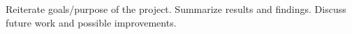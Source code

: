 \documentclass[runningheads]{llncs}
\begin{document}
Reiterate goals/purpose of the project. Summarize results and findings.
Discuss future work and possible improvements.

\newpage











\end{document}
